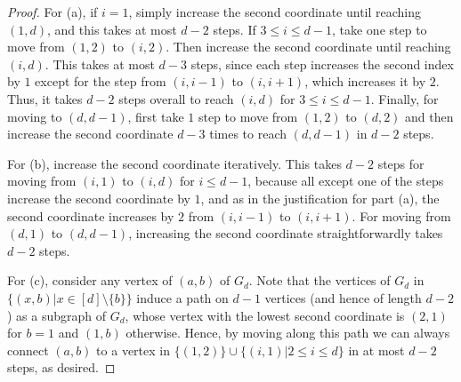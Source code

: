 \documentclass[centering,11pt,reqno]{amsart}
\theoremstyle{definition}
\begin{document}
\begin{proof}
For (a), if $i = 1$, simply increase the second coordinate until reaching $(1,d)$, and this takes at most $d-2$ steps. If $3 \leq i \leq d-1$, take one step to move from $(1,2)$ to $(i,2)$. Then increase the second coordinate until reaching $(i,d)$. This takes at most $d-3$ steps, since each step increases the second index by $1$ except for the step from $(i,i-1)$ to $(i,i+1)$, which increases it by $2$. Thus, it takes $d-2$ steps overall to reach $(i,d)$ for $3 \leq i \leq d-1$. Finally, for moving to $(d,d-1)$, first take $1$ step to move from $(1,2)$ to $(d,2)$ and then increase the second coordinate $d-3$ times to reach $(d,d-1)$ in $d-2$ steps.

For (b), increase the second coordinate iteratively. This takes $d-2$ steps for moving from $(i,1)$ to $(i,d)$ for $i \leq d-1$, because all except one of the steps increase the second coordinate by $1$, and as in the justification for part (a), the second coordinate increases by $2$ from $(i,i-1)$ to $(i,i+1)$. For moving from $(d,1)$ to $(d,d-1)$, increasing the second coordinate straightforwardly takes $d-2$ steps. 



For (c), consider any vertex of $(a,b)$ of $G_d$. Note that the vertices of $G_d$ in $\{(x,b)|x\in [d]\setminus \{b\}\}$ induce a path on $d-1$ vertices (and hence of length $d-2$) as a subgraph of $G_d$, whose vertex with the lowest second coordinate is $(2,1)$ for $b=1$ and $(1,b)$ otherwise. Hence, by moving along this path we can always connect $(a,b)$ to a vertex in $\{(1,2)\}\cup \{(i,1)|2\le i \le d\}$ in at most $d-2$ steps, as desired.


\end{proof}
\end{document}
